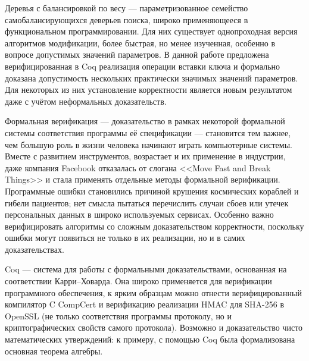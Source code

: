 \documentclass[a4paper,14pt]{extarticle}
\begin{document}
Деревья с балансировкой по весу ---
параметризованное семейство
самобалансирующихся деверьев поиска,
широко применяющееся в функциональном программировании.
Для них существует однопроходная версия алгоритмов модификации,
более быстрая, но менее изученная,
особенно в вопросе допустимых значений параметров.
В данной работе предложена
верифицированная в Coq
реализация операции вставки ключа и
формально доказана допустимость
нескольких практически значимых значений параметров.
Для некоторых из них установление корректности
является новым результатом
даже с учётом неформальных доказательств.

\clearpage
\tableofcontents

\clearpage
{}

Формальная верификация ---
доказательство в рамках некоторой формальной системы 
соответствия программы её спецификации ---
становится тем важнее, чем большую роль
в жизни человека начинают играть компьютерные системы.
Вместе с развитием инструментов,
возрастает и их применение в индустрии,
даже компания Facebook
отказалась от слогана <<Move Fast and Break Things>>\cite{breakThings}
и стала применять отдельные методы формальной верификации\cite{facebook}.
Программные ошибки становились причиной
крушения космических кораблей\cite{mco-report}
и гибели пациентов\cite{therac};
нет смысла пытаться перечислить случаи
сбоев или утечек персональных данных
в широко используемых сервисах.
Особенно важно верифицировать алгоритмы
со сложным доказательством корректности, поскольку
ошибки могут появиться не только в их реализации,
но и в самих доказательствах.

Coq\cite{coq}\cite{coqart} --- система для работы с формальными доказательствами,
основанная на соответствии Карри--Ховарда.
Она широко применяется для верификации программного обеспечения,
к ярким образцам можно отнести
верифицированный компилятор C CompCert\cite{compcert}
и верификацию реализации HMAC для SHA-256 в OpenSSL\cite{hmac}
(не только соответствия программы протоколу,
но и криптографических свойств самого протокола).
Возможно и доказательство чисто математических утверждений:
к примеру, с помощью Coq была формализована
основная теорема алгебры\cite{fta}.
\end{document}
